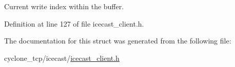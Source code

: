 Current write index within the buffer. 



Definition at line 127 of file icecast\+\_\+client.\+h.



The documentation for this struct was generated from the following file\+:\begin{DoxyCompactItemize}
\item 
cyclone\+\_\+tcp/icecast/\hyperlink{icecast__client_8h}{icecast\+\_\+client.\+h}\end{DoxyCompactItemize}
